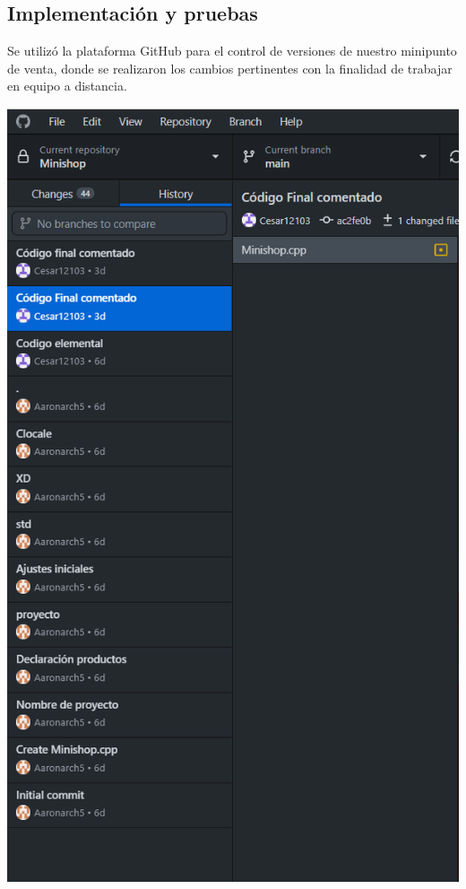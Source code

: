 \documentclass{article}
\begin{document}
\clearpage
\newpage

\begin{center}

\section{Implementación y pruebas}
\end{center}
    Se utilizó la plataforma GitHub para el control de versiones de nuestro minipunto de venta, donde se realizaron los cambios pertinentes con la finalidad de trabajar en equipo a distancia.\\
    
    
    \begin{center} 
	\includegraphics[scale=0.3]{Images/Captura de pantalla (213).png}
	\label{figura3a}
\end{center}
\end{document}
